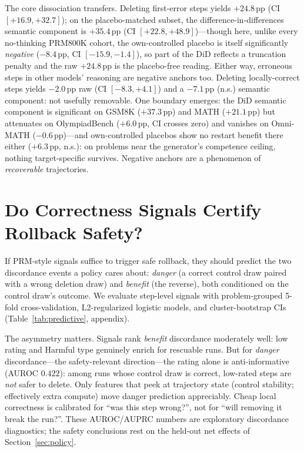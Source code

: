 \documentclass[11pt]{article}
\newcommand{\ci}[2]{[#1, #2]}
\begin{document}
The core dissociation transfers. Deleting first-error steps yields $+24.8$\,pp (CI $\ci{+16.9}{+32.7}$); on the placebo-matched subset, the difference-in-differences semantic component is $+35.4$\,pp (CI $\ci{+22.8}{+48.9}$)---though here, unlike every no-thinking PRM800K cohort, the own-controlled placebo is itself significantly \emph{negative} ($-8.4$\,pp, CI $\ci{-15.9}{-1.4}$), so part of the DiD reflects a truncation penalty and the raw $+24.8$\,pp is the placebo-free reading. Either way, erroneous steps in other models' reasoning are negative anchors too. Deleting locally-correct steps yields $-2.0$\,pp raw (CI $\ci{-8.3}{+4.1}$) and a $-7.1$\,pp (n.s.) semantic component: not usefully removable. One boundary emerges: the DiD semantic component is significant on GSM8K ($+37.3$\,pp) and MATH ($+21.1$\,pp) but attenuates on OlympiadBench ($+6.0$\,pp, CI crosses zero) and vanishes on Omni-MATH ($-0.6$\,pp)---and own-controlled placebos show no restart benefit there either ($+6.3$\,pp, n.s.): on problems near the generator's competence ceiling, nothing target-specific survives. Negative anchors are a phenomenon of \emph{recoverable} trajectories.

\section{Do Correctness Signals Certify Rollback Safety?}
\label{sec:signals}

If PRM-style signals suffice to trigger safe rollback, they should predict the two discordance events a policy cares about: \emph{danger} (a correct control draw paired with a wrong deletion draw) and \emph{benefit} (the reverse), both conditioned on the control draw's outcome. We evaluate step-level signals with problem-grouped 5-fold cross-validation, L2-regularized logistic models, and cluster-bootstrap CIs (Table~\ref{tab:predictive}, appendix).

The asymmetry matters. Signals rank \emph{benefit} discordance moderately well: low rating and Harmful type genuinely enrich for rescuable runs. But for \emph{danger} discordance---the safety-relevant direction---the rating alone is anti-informative (AUROC $0.422$): among runs whose control draw is correct, low-rated steps are \emph{not} safer to delete. Only features that peek at trajectory state (control stability; effectively extra compute) move danger prediction appreciably. Cheap local correctness is calibrated for ``was this step wrong?'', not for ``will removing it break the run?''. These AUROC/AUPRC numbers are exploratory discordance diagnostics; the safety conclusions rest on the held-out net effects of Section~\ref{sec:policy}.
\end{document}
